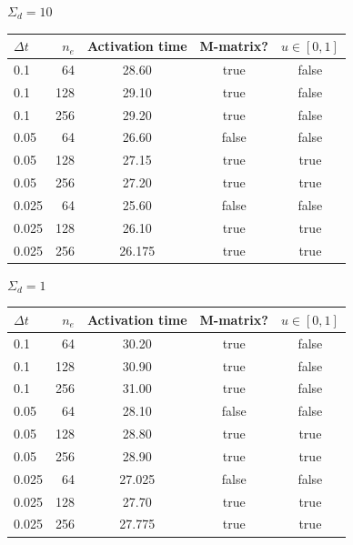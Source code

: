 \documentclass[unicode,11pt,a4paper,oneside,numbers=endperiod,openany]{article}
\begin{document}
$\Sigma_d = 10$
\begin{table}[H]
	\centering
	\begin{tabular}{l|r|ccc}
		$\Delta t$ & $n_e$ & Activation time & M-matrix? & $u \in [0, 1]$ \\
		\hline
		0.1        & 64    & 28.60           & true      & false          \\
		0.1        & 128   & 29.10           & true      & false          \\
		0.1        & 256   & 29.20           & true      & false          \\
		0.05       & 64    & 26.60           & false     & false          \\
		0.05       & 128   & 27.15           & true      & true           \\
		0.05       & 256   & 27.20           & true      & true           \\
		0.025      & 64    & 25.60           & false     & false          \\
		0.025      & 128   & 26.10           & true      & true           \\
		0.025      & 256   & 26.175          & true      & true           \\
	\end{tabular}
\end{table}

$\Sigma_d = 1$
\begin{table}[H]
	\centering
	\begin{tabular}{l|r|ccc}
		$\Delta t$ & $n_e$ & Activation time & M-matrix? & $u \in [0, 1]$ \\
		\hline
		0.1        & 64    & 30.20           & true      & false          \\
		0.1        & 128   & 30.90           & true      & false          \\
		0.1        & 256   & 31.00           & true      & false          \\
		0.05       & 64    & 28.10           & false     & false          \\
		0.05       & 128   & 28.80           & true      & true           \\
		0.05       & 256   & 28.90           & true      & true           \\
		0.025      & 64    & 27.025          & false     & false          \\
		0.025      & 128   & 27.70           & true      & true           \\
		0.025      & 256   & 27.775          & true      & true           \\
	\end{tabular}
\end{table}
\end{document}
